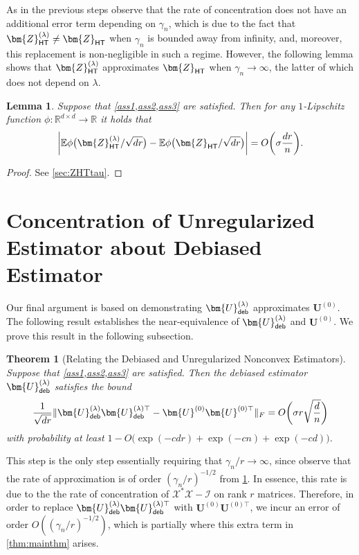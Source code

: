 \documentclass[10pt]{article}
\newcommand{\s}{^*}
\newtheorem{theorem}{Theorem}
\newtheorem{lemma}{Lemma}
\theoremstyle{definition}
\begin{document}
As in the previous steps observe that the rate of concentration does not have an additional error term depending on $\gamma_n$, which is due to the fact that $\bm{Z}_{{\sf HT}}^{(\lambda)} \neq \bm{Z}_{{\sf HT}}$ when $\gamma_n$ is bounded away from infinity, and, moreover, this replacement is non-negligible in such a regime.  However, the following lemma shows that $\bm{Z}_{{\sf HT}}^{(\lambda)}$ approximates $\bm{Z}_{{\sf HT}}$ when $\gamma_n \to \infty$, the latter of which does not depend on $\lambda$.
\begin{lemma}\label{lem:ZHTtau} Suppose that \cref{ass1,ass2,ass3} are satisfied. Then for any $1$-Lipschitz function $\phi: \mathbb{R}^{d\times d} \to \mathbb{R}$ it holds that
    \begin{align}
         \bigg| \mathbb{E} \phi \big( \bm{Z}_{{\sf HT}}^{(\lambda)}/\sqrt{dr} \big) - \mathbb{E} \phi \big( \bm{Z}_{{\sf HT}}^{}/\sqrt{dr} \big) \bigg| = O\bigg( \sigma\frac{dr}{n} \bigg).
    \end{align}
\end{lemma}
\begin{proof}
    See \cref{sec:ZHTtau}.  
\end{proof}


\section{Concentration of Unregularized Estimator about Debiased Estimator} \label{sec:debnearequivalence}
Our final argument is based on demonstrating $\bm{U}_{{\sf deb}}^{(\lambda)}$ approximates $\bm{U}^{(0)}$.  The following result establishes the near-equivalence of $\bm{U}_{{\sf deb}}^{(\lambda)}$ and $\bm{U}^{(0)}$.  We prove this result in the following subsection.
\begin{theorem}[Relating the Debiased and Unregularized Nonconvex Estimators] \label{thm:debunreg} Suppose that \cref{ass1,ass2,ass3} are satisfied.  Then the debiased estimator $\bm{U}^{(\lambda)}_{{\sf deb}}$ satisfies the bound
    \begin{align}
      \frac{1}{\sqrt{dr}}   \|\bm{U}^{(\lambda)}_{{\sf deb}} \bm{U}^{(\lambda)\top}_{{\sf deb}} - \bm{U}^{(0)} \bm{U}^{(0)\top}\|_F = O\bigg( \sigma r\sqrt{\frac{d}{n}} \bigg)
    \end{align}
    with probability at least $1 - O\bigg( \exp( - c dr) + \exp(- c n) + \exp( - c d) \bigg)$.  
\end{theorem}
 

This step is the only step essentially requiring that $\gamma_n/r \to \infty$, since observe that the rate of approximation is of order $(\gamma_n/r)^{-1/2}$ from \cref{thm:debunreg}.  In essence, this rate is due to the 
the rate of concentration of $\mathcal{X}\s \mathcal{X} - \mathcal{I}$ on rank $r$ matrices.  Therefore, in order to replace $\bm{U}_{{\sf deb}}^{(\lambda)} \bm{U}_{{\sf deb}}^{(\lambda)\top}$ with  $\bm{U}^{(0)}\bm{U}^{(0)\top}$, we incur an error of order $O((\gamma_n/r)^{-1/2})$, which is partially where this extra term in \cref{thm:mainthm} arises.  
\end{document}
